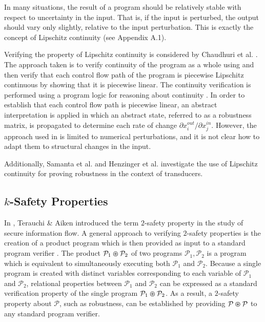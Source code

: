 \documentclass{llncs}
\begin{document}
    \space\space 
    In many situations, the result of a program should be relatively
    stable with respect to uncertainty in the input.  That is, if the input is
    perturbed, the output should vary only slightly, relative to the input
    perturbation. This is exactly the concept of Lipschitz continuity (see Appendix A.1).

    Verifying the property of Lipschitz continuity is considered by Chaudhuri et al.
    \cite{chaudhuri11}.  The approach taken is to verify continuity of
    the program as a whole using \cite{chaudhuri11} and then verify that each control flow path of the
    program is piecewise Lipschitz continuous by showing that it is piecewise
    linear.  The continuity verification is performed using a program logic for
    reasoning about continuity \cite{chaudhuri10}.  In order to establish that each
    control flow path is piecewise linear, an abstract interpretation is applied in
    which an abstract state, referred to as a robustness matrix, is propagated to
    determine each rate of change \(\partial x_{i}^{out}/\partial x_{j}^{in}\).
    However, the approach used in
    \cite{chaudhuri10,chaudhuri11} is limited to numerical perturbations,
    and it is not clear how to adapt them to structural changes in the input.

    Additionally, Samanta et al. \cite{samanta13} and
    Henzinger et al. \cite{samanta14} investigate the use of Lipschitz continuity
    for proving robustness in the context of transducers.

  \subsection{$k$-Safety Properties}
    \space\space In \cite{terauchi05},
    Terauchi \& Aiken introduced the term \(2\)-safety property in the study of secure information flow.
    A general approach to verifying \(2\)-safety properties is the creation of a
    product program which is then provided as input to a standard program verifier
    \cite{bartheproduct}.  The product \(\mathcal{P}_{1} \varoast \mathcal{P}_{2}\)
    of two programs \(\mathcal{P}_{1}, \mathcal{P}_{2}\) is a program which is
    equivalent to simultaneously executing both \(\mathcal{P}_{1}\) and
    \(\mathcal{P}_{2}\).  Because a single program is created with distinct
    variables corresponding to each variable of \(\mathcal{P}_{1}\) and
    \(\mathcal{P}_{2}\), relational properties between \(\mathcal{P}_{1}\) and
    \(\mathcal{P}_{2}\) can be expressed as a standard verification property of the
    single program \(\mathcal{P}_{1} \varoast \mathcal{P}_{2}\).  As a result, a
    \(2\)-safety property about \(\mathcal{P}\), such as robustness, can be
    established by providing \(\mathcal{P} \varoast \mathcal{P}\) to any standard
    program verifier.
\end{document}
